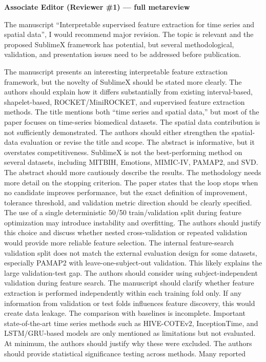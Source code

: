 \documentclass[11pt]{article}
\newcommand{\rcitem}[2]{\begin{reviewerbox}\textbf{#1}\par\smallskip#2\end{reviewerbox}}
\begin{document}
\rcitem{Associate Editor (Reviewer \#1) --- full metareview}{The manuscript ``Interpretable
supervised feature extraction for time series and spatial data'', I would recommend major
revision. The topic is relevant and the proposed SublimeX framework has potential, but several
methodological, validation, and presentation issues need to be addressed before publication.

The manuscript presents an interesting interpretable feature extraction framework, but the novelty
of SublimeX should be stated more clearly. The authors should explain how it differs
substantially from existing interval-based, shapelet-based, ROCKET/MiniROCKET, and supervised
feature extraction methods.
The title mentions both ``time series and spatial data,'' but most of the paper focuses on
time-series biomedical datasets. The spatial data contribution is not sufficiently demonstrated.
The authors should either strengthen the spatial-data evaluation or revise the title and scope.
The abstract is informative, but it overstates competitiveness. SublimeX is not the best-performing
method on several datasets, including MITBIH, Emotions, MIMIC-IV, PAMAP2, and SVD. The abstract
should more cautiously describe the results.
The methodology needs more detail on the stopping criterion. The paper states that the loop stops
when no candidate improves performance, but the exact definition of improvement, tolerance
threshold, and validation metric direction should be clearly specified.
The use of a single deterministic 50/50 train/validation split during feature optimization may
introduce instability and overfitting. The authors should justify this choice and discuss whether
nested cross-validation or repeated validation would provide more reliable feature selection.
The internal feature-search validation split does not match the external evaluation design for
some datasets, especially PAMAP2 with leave-one-subject-out validation. This likely explains the
large validation-test gap. The authors should consider using subject-independent validation
during feature search.
The manuscript should clarify whether feature extraction is performed independently within each
training fold only. If any information from validation or test folds influences feature discovery,
this would create data leakage.
The comparison with baselines is incomplete. Important state-of-the-art time series methods such
as HIVE-COTEv2, InceptionTime, and LSTM/GRU-based models are only mentioned as limitations but
not evaluated. At minimum, the authors should justify why these were excluded.
The authors should provide statistical significance testing across methods. Many reported
}
\end{document}
